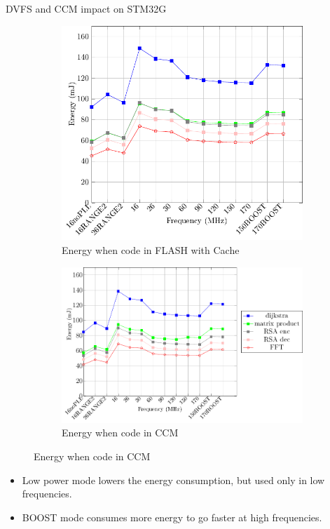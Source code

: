 \documentclass[
	11pt, %
]{beamer}
\begin{document}
\begin{frame}{DVFS and CCM impact on STM32G}
	\begin{figure}
		\begin{subfigure}{0.4\textwidth}
			\includegraphics[scale = 0.4]{data/stm32g_v2/abs/abs_energy_flash_32g.pdf}
			\caption{Energy when code in FLASH with Cache}
		\end{subfigure}
		\begin{subfigure}{0.4\textwidth}
			\includegraphics[scale = 0.4]{data/stm32g_v2/abs/abs_energy_ccm.pdf}
			\caption{Energy when code in CCM}
		\end{subfigure}
	\end{figure}
	\begin{itemize}
		\item Low power mode lowers the energy consumption, but used only in low frequencies.
		\item BOOST mode consumes more energy to go faster at high frequencies. 
	\end{itemize}
\end{frame}
\end{document}
